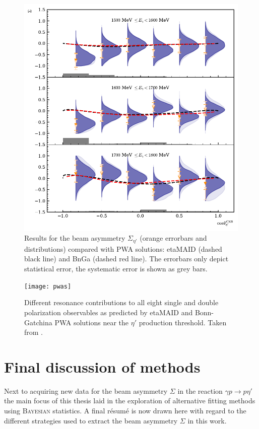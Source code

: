 \begin{figure}[htbp]
\centering
\includegraphics[width=\linewidth]{../bayes/etap_event_based_fit/plots/sigma_etap_pwa.pdf}
\caption{Results for the beam asymmetry $\Sigma_{\eta'}$ (orange errorbars and distributions) compared with PWA solutions:  etaMAID \cite{etaMAID,pwa_online} (dashed black line) and BnGa \cite{etap_bnga} (dashed red line). The errorbars only depict statistical error, the systematic error is shown as grey bars.}
\label{fig:pwa}
\end{figure}

\begin{figure}[htbp]
	\centering
	\texttt{[image: pwas]}
	\caption{Different resonance contributions to all eight single and double polarization observables as predicted by etaMAID \cite{etaMAID} and Bonn-Gatchina \cite{etap_bnga} PWA solutions near the $\eta'$ production threshold. Taken from \cite{etaMAID}.}
	\label{fig:pwas}
\end{figure} 
\section{Final discussion of methods}
Next to acquiring new data for the beam asymmetry $\Sigma$ in the reaction $\gamma p\to p\eta'$ the main focus of this thesis laid in the exploration of alternative fitting methods using \textsc{Bayesian} statistics. A final r\'{e}sum\'{e} is now drawn here with regard to the different strategies used to extract the beam asymmetry $\Sigma$ in this work.

